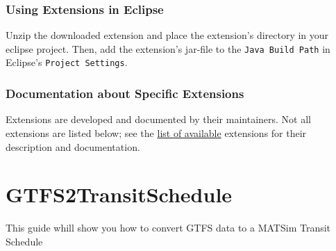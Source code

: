 \documentclass[a4paper,11pt]{report}
\begin{document}
\subsubsection{Using Extensions in Eclipse}

Unzip the downloaded extension and place the extension's directory in  your eclipse project. Then, add the extension's jar-file to the 
\texttt{Java Build Path} in Eclipse's 
\texttt{Project Settings}.

\subsubsection{Documentation about Specific Extensions}

Extensions are developed and documented by their maintainers. Not all extensions are listed below; see the \href{http://www.matsim.org/extensions}{list of available} extensions for their description and documentation.



\vfill\eject
\section{GTFS2TransitSchedule}

This guide whill show you how to convert GTFS data to a MATSim Transit Schedule
\end{document}
